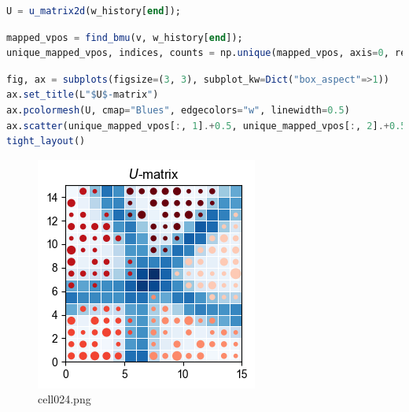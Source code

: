 \begin{lstlisting}[language=julia]
U = u_matrix2d(w_history[end]);
\end{lstlisting}
\begin{lstlisting}[language=julia]
mapped_vpos = find_bmu(v, w_history[end]);
unique_mapped_vpos, indices, counts = np.unique(mapped_vpos, axis=0, return_index=true, return_counts=true);
\end{lstlisting}
\begin{lstlisting}[language=julia]
fig, ax = subplots(figsize=(3, 3), subplot_kw=Dict("box_aspect"=>1))
ax.set_title(L"$U$-matrix")
ax.pcolormesh(U, cmap="Blues", edgecolors="w", linewidth=0.5)
ax.scatter(unique_mapped_vpos[:, 1].+0.5, unique_mapped_vpos[:, 2].+0.5, s=counts*10, color=vcolors[indices.+1])
tight_layout()
\end{lstlisting}
\begin{figure}[ht]
	\centering
	\includegraphics[scale=0.8, max width=\linewidth]{./fig/local-learning-rule/self-organizing-map/cell024.png}
	\caption{cell024.png}
	\label{cell024.png}
\end{figure}
